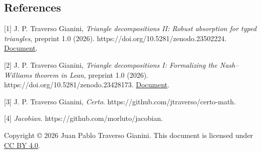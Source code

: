 \documentclass[english,11pt,a4paper]{article}
\begin{document}
\noindent\begin{minipage}{\linewidth}
\subsection{References}\label{references}

\begingroup\small\raggedright
\setlength{\parskip}{3pt}

{[}1{]} J. P. Traverso Gianini, \emph{Triangle decompositions II: Robust absorption for typed triangles}, preprint 1.0 (2026). https://doi.org/10.5281/zenodo.23502224. \href{https://github.com/jtraverso/nash-williams-triangle-decompositions/blob/main/preprints/PAPER_II/01_manuscript/PAPER_II_preprint_v1.0_en.md}{Document}.

{[}2{]} J. P. Traverso Gianini, \emph{Triangle decompositions I: Formalizing the Nash--Williams theorem in Lean}, preprint 1.0 (2026). https://doi.org/10.5281/zenodo.23428173. \href{https://github.com/jtraverso/nash-williams-triangle-decompositions/blob/main/preprints/PAPER_I/01_manuscript/PAPER_I_preprint_v1.0_en.md}{Document}.

{[}3{]} J. P. Traverso Gianini, \emph{Certo}. https://github.com/jtraverso/certo-math.

{[}4{]} \emph{Jacobian}. https://github.com/morluto/jacobian.

Copyright © 2026 Juan Pablo Traverso Gianini. This document is licensed under \href{https://creativecommons.org/licenses/by/4.0/}{CC BY 4.0}.

\endgroup

\end{minipage}
\end{document}
